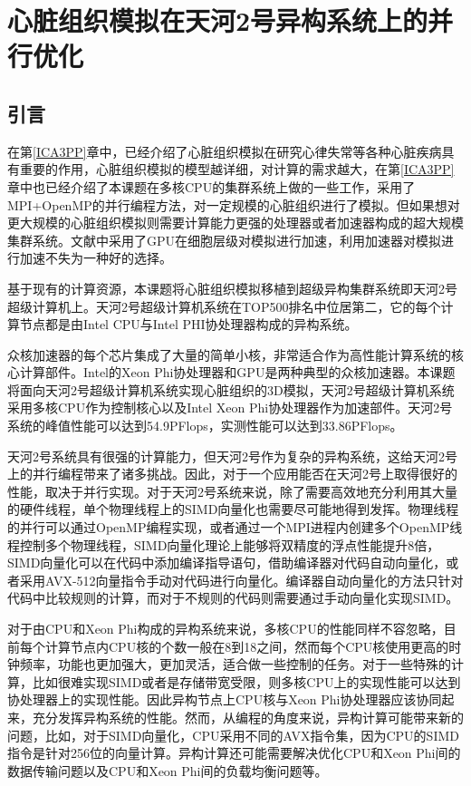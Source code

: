 
\chapter{心脏组织模拟在天河2号异构系统上的并行优化}
\label{icpads}

\section{引言}
在第\ref{ICA3PP}章中，已经介绍了心脏组织模拟在研究心律失常等各种心脏疾病具有重要的作用，心脏组织模拟的模型越详细，对计算的需求越大，在第\ref{ICA3PP}章中也已经介绍了本课题在多核CPU的集群系统上做的一些工作，采用了MPI+OpenMP的并行编程方法，对一定规模的心脏组织进行了模拟。但如果想对更大规模的心脏组织模拟则需要计算能力更强的处理器或者加速器构成的超大规模集群系统。文献中采用了GPU在细胞层级对模拟进行加速，利用加速器对模拟进行加速不失为一种好的选择。

基于现有的计算资源，本课题将心脏组织模拟移植到超级异构集群系统即天河2号超级计算机上。天河2号超级计算机系统在TOP500排名中位居第二，它的每个计算节点都是由Intel CPU与Intel PHI协处理器构成的异构系统。

众核加速器的每个芯片集成了大量的简单小核，非常适合作为高性能计算系统的核心计算部件。Intel的Xeon Phi协处理器和GPU是两种典型的众核加速器。本课题将面向天河2号超级计算机系统实现心脏组织的3D模拟，天河2号超级计算机系统采用多核CPU作为控制核心以及Intel Xeon Phi协处理器作为加速部件。天河2号系统的峰值性能可以达到54.9PFlops，实测性能可以达到33.86PFlops。

天河2号系统具有很强的计算能力，但天河2号作为复杂的异构系统，这给天河2号上的并行编程带来了诸多挑战。因此，对于一个应用能否在天河2号上取得很好的性能，取决于并行实现。对于天河2号系统来说，除了需要高效地充分利用其大量的硬件线程，单个物理线程上的SIMD向量化也需要尽可能地得到发挥。物理线程的并行可以通过OpenMP编程实现，或者通过一个MPI进程内创建多个OpenMP线程控制多个物理线程，SIMD向量化理论上能够将双精度的浮点性能提升8倍，SIMD向量化可以在代码中添加编译指导语句，借助编译器对代码自动向量化，或者采用AVX-512向量指令手动对代码进行向量化。编译器自动向量化的方法只针对代码中比较规则的计算，而对于不规则的代码则需要通过手动向量化实现SIMD。

对于由CPU和Xeon Phi构成的异构系统来说，多核CPU的性能同样不容忽略，目前每个计算节点内CPU核的个数一般在8到18之间，然而每个CPU核使用更高的时钟频率，功能也更加强大，更加灵活，适合做一些控制的任务。对于一些特殊的计算，比如很难实现SIMD或者是存储带宽受限，则多核CPU上的实现性能可以达到协处理器上的实现性能。因此异构节点上CPU核与Xeon Phi协处理器应该协同起来，充分发挥异构系统的性能。然而，从编程的角度来说，异构计算可能带来新的问题，比如，对于SIMD向量化，CPU采用不同的AVX指令集，因为CPU的SIMD指令是针对256位的向量计算。异构计算还可能需要解决优化CPU和Xeon Phi间的数据传输问题以及CPU和Xeon Phi间的负载均衡问题等。

